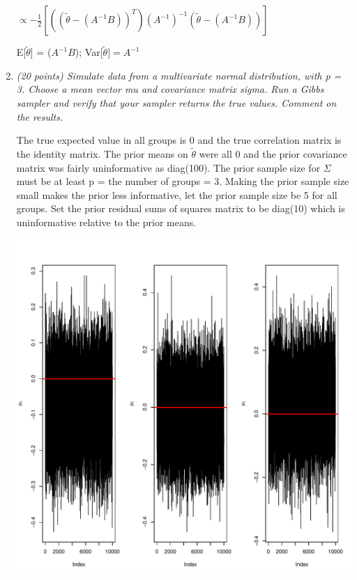 \documentclass{article}\usepackage[]{graphicx}\usepackage[]{color}
\makeatletter
\def\maxwidth{ %
  \ifdim\Gin@nat@width>\linewidth
    \linewidth
  \else
    \Gin@nat@width
  \fi
}
\newenvironment{knitrout}{}{} %
\makeatother
\begin{document}
\begin{enumerate}
$\propto -\frac{1}{2} [((\widetilde{\theta} - (A^{-1}B))^{T})(A^{-1})^{-1} (\widetilde{\theta} - (A^{-1}B))]$

\rightarrow E[$\widetilde{\theta}$] = ($A^{-1}B$); Var[$\widetilde{\theta}] = A^{-1}$

\item %
{\it (20 points) Simulate data from a multivariate normal distribution, with p = 3. Choose a mean vector mu and covariance matrix sigma. Run a Gibbs sampler and verify that your sampler returns the true values. Comment on the results.}

The true expected value in all groups is 0 and the true correlation matrix is the identity matrix. The prior means on $\widetilde{\theta}$ were all 0 and the prior covariance matrix was fairly uninformative as diag(100). The prior sample size for $\Sigma$ must be at least p = the number of groups = 3. Making the prior sample size small makes the prior less informative, let the prior sample size be 5 for all groups. Set the prior residual sums of squares matrix to be diag(10) which is uninformative relative to the prior means.
\begin{knitrout}
\color{fgcolor}

{\centering \includegraphics[width=\maxwidth]{figure/prob4-1} 

}
\end{knitrout}
\end{enumerate}
\end{document}

